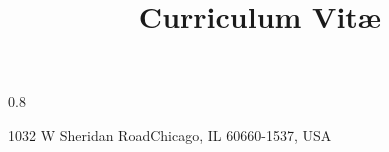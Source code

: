 \usepackage{etoolbox,changepage}
\patchcmd{\makehead}%
  {0.8\textwidth}%
  {\linewidth}%
  {}{}%
  
\title{Curriculum Vitæ}                               %
\address{Loyola University Chicago}{1032 W Sheridan Road}{Chicago, IL 60660-1537, USA}%
